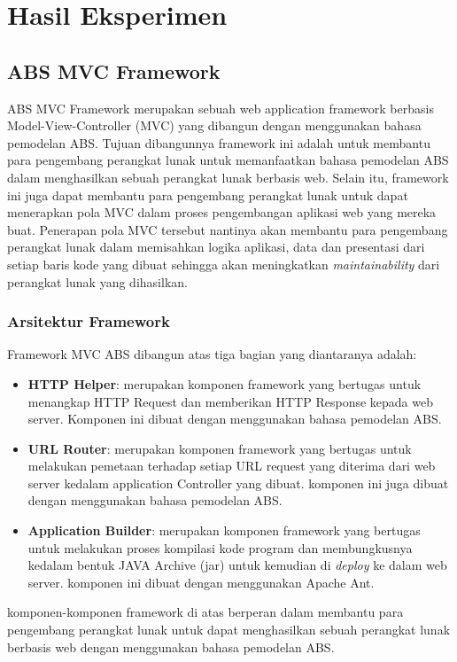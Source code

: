 \chapter{Hasil Eksperimen}

\section{ABS MVC Framework}
ABS MVC Framework merupakan sebuah web application framework berbasis Model-View-Controller (MVC) yang dibangun dengan menggunakan bahasa pemodelan ABS. Tujuan dibangunnya framework ini adalah untuk membantu para pengembang perangkat lunak untuk memanfaatkan bahasa pemodelan ABS dalam menghasilkan sebuah perangkat lunak berbasis web. Selain itu, framework ini juga dapat membantu para pengembang perangkat lunak untuk dapat menerapkan pola MVC dalam proses pengembangan aplikasi web yang mereka buat. Penerapan pola MVC tersebut nantinya akan membantu para pengembang perangkat lunak dalam memisahkan logika aplikasi, data dan presentasi dari setiap baris kode yang dibuat sehingga akan meningkatkan \textit{maintainability} dari perangkat lunak yang dihasilkan.

\subsection{Arsitektur Framework}
Framework MVC ABS dibangun atas tiga bagian yang diantaranya adalah:
\begin{itemize}
    \item \textbf{HTTP Helper}: merupakan komponen framework yang bertugas untuk menangkap HTTP Request dan memberikan HTTP Response kepada web server. Komponen ini dibuat dengan menggunakan bahasa pemodelan ABS.
    \item \textbf{URL Router}: merupakan komponen framework yang bertugas untuk melakukan pemetaan terhadap setiap URL request yang diterima dari web server kedalam application Controller yang dibuat. komponen ini juga dibuat dengan menggunakan bahasa pemodelan ABS.
    \item \textbf{Application Builder}: merupakan komponen framework yang bertugas untuk melakukan proses kompilasi kode program dan membungkusnya kedalam bentuk JAVA Archive (jar) untuk kemudian di \textit{deploy} ke dalam web server. komponen ini dibuat dengan menggunakan Apache Ant.
\end{itemize}

\noindent
komponen-komponen framework di atas berperan dalam membantu para pengembang perangkat lunak untuk dapat menghasilkan sebuah perangkat lunak berbasis web dengan menggunakan bahasa pemodelan ABS.

